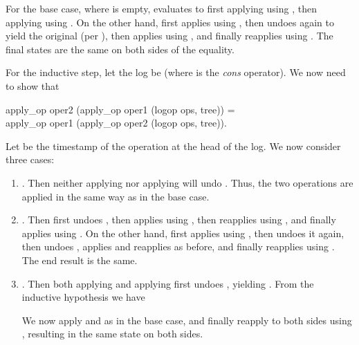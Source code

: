 \documentclass[sigplan,anonymous]{acmart}
\renewenvironment{isabelle}{%
  \medbreak\noindent%
  \renewcommand{\isanewline}{\\}%
  \begin{minipage}{\columnwidth}%
  \begin{isabellebody}%
  \begin{tabbing}%
}{%
  \end{tabbing}%
  \end{isabellebody}%
  \end{minipage}%
  \medbreak%
}
\begin{document}
For the base case, where  is empty,  evaluates to first applying  using , then applying  using .
On the other hand,  first applies  using , then undoes  again to yield the original  (per ), then applies  using , and finally reapplies  using .
The final states are the same on both sides of the equality.

For the inductive step, let the log be  (where \isa{\isacharhash} is the \emph{cons} operator).
We now need to show that
\begin{isabelle}
apply\_op oper2 (apply\_op oper1 (logop {\isacharhash} ops, tree)) =\\
apply\_op oper1 (apply\_op oper2 (logop {\isacharhash} ops, tree)).
\end{isabelle}
Let  be the timestamp of the operation at the head of the log.
We now consider three cases:
\begin{enumerate}
    \item {}.
        Then neither applying  nor applying  will undo .
        Thus, the two operations are applied in the same way as in the base case.
    \item {}.
        Then  first undoes , then applies  using , then reapplies  using , and finally applies  using .
        On the other hand,  first applies  using , then undoes it again, then undoes , applies  and reapplies  as before, and finally reapplies  using .
        The end result is the same.
    \item {}.
        Then both applying  and applying  first undoes , yielding .
        From the inductive hypothesis we have
        \begin{quote}
        \end{quote}
        We now apply  and  as in the base case, and finally reapply  to both sides using , resulting in the same state on both sides.
\end{enumerate}
\end{document}
